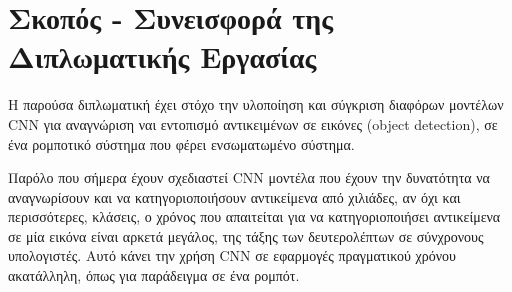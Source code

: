 \section{Σκοπός - Συνεισφορά της Διπλωματικής Εργασίας}
\label{section:contribution}
Η παρούσα διπλωματική έχει στόχο την υλοποίηση και σύγκριση διαφόρων
μοντέλων CNN για αναγνώριση ναι εντοπισμό αντικειμένων σε εικόνες
(object detection), σε ένα ρομποτικό σύστημα που φέρει ενσωματωμένο σύστημα.

Παρόλο που σήμερα έχουν σχεδιαστεί CNN μοντέλα που έχουν την δυνατότητα να
αναγνωρίσουν και να κατηγοριοποιήσουν αντικείμενα από χιλιάδες, αν όχι και περισσότερες, κλάσεις, ο χρόνος που
απαιτείται για να κατηγοριοποιήσει αντικείμενα σε μία εικόνα είναι αρκετά μεγάλος,
της τάξης των δευτερολέπτων σε σύνχρονους υπολογιστές.
Αυτό κάνει την χρήση CNN σε εφαρμογές πραγματικού
χρόνου ακατάλληλη, όπως για παράδειγμα σε ένα ρομπότ.


